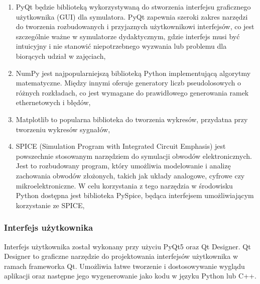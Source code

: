 \begin{enumerate}
    \item PyQt będzie biblioteką wykorzystywaną do stworzenia interfejsu graficznego użytkownika (GUI) dla symulatora. PyQt zapewnia szeroki zakres narzędzi do tworzenia rozbudowanych i przyjaznych użytkownikowi interfejsów, co jest szczególnie ważne w symulatorze dydaktycznym, gdzie interfejs musi być intuicyjny i nie stanowić niepotrzebnego wyzwania lub problemu dla biorących udział w zajęciach,
    \item NumPy jest najpopularniejszą biblioteką Python implementującą algorytmy matematyczne. Między innymi oferuje generatory liczb pseudolosowych o różnych rozkładach, co jest wymagane do prawidłowego generowania ramek ethernetowych i błędów,
    \item  Matplotlib to popularna biblioteka do tworzenia wykresów, przydatna przy tworzeniu wykresów sygnałów,
    \item SPICE (Simulation Program with Integrated Circuit Emphasis) jest powszechnie stosowanym narzędziem do symulacji obwodów elektronicznych. Jest to rozbudowany program, który umożliwia modelowanie i analizę zachowania obwodów złożonych, takich jak układy analogowe, cyfrowe czy mikroelektroniczne. W celu korzystania z tego narzędzia w środowisku Python dostępna jest biblioteka PySpice, będąca interfejsem umożliwiającym korzystanie ze SPICE,
\end{enumerate}

\subsubsection{Interfejs użytkownika}
Interfejs użytkownika został wykonany przy użyciu PyQt5 oraz Qt Designer. Qt Designer to graficzne narzędzie do projektowania interfejsów użytkownika w ramach frameworka Qt. Umożliwia łatwe tworzenie i dostosowywanie wyglądu aplikacji oraz następne jego wygenerowanie jako kodu w języku Python lub C++.

